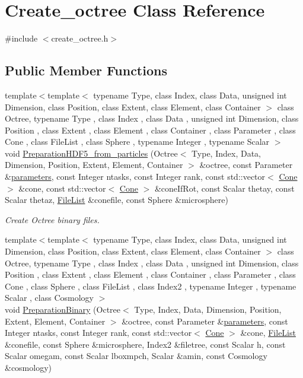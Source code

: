 \hypertarget{classCreate__octree}{\section{Create\-\_\-octree Class Reference}
\label{classCreate__octree}
}


{\ttfamily \#include $<$create\-\_\-octree.\-h$>$}

\subsection*{Public Member Functions}
\begin{DoxyCompactItemize}
\item 
{\footnotesize template$<$template$<$ typename Type, class Index, class Data, unsigned int Dimension, class Position, class Extent, class Element, class Container $>$ class Octree, typename Type , class Index , class Data , unsigned int Dimension, class Position , class Extent , class Element , class Container , class Parameter , class Cone , class File\-List , class Sphere , typename Integer , typename Scalar $>$ }\\void \hyperlink{classCreate__octree_aa5eeca0cadf9d5f3c7e879bff2056db3}{Preparation\-H\-D\-F5\-\_\-from\-\_\-particles} (Octree$<$ Type, Index, Data, Dimension, Position, Extent, Element, Container $>$ \&octree, const Parameter \&\hyperlink{rays_8h_ae1bc8b0b8c8b9f8e4cc61a5cc7c4ce9e}{parameters}, const Integer ntasks, const Integer rank, const std\-::vector$<$ \hyperlink{exceptionCone}{Cone} $>$ \&cone, const std\-::vector$<$ \hyperlink{exceptionCone}{Cone} $>$ \&cone\-If\-Rot, const Scalar thetay, const Scalar thetaz, \hyperlink{exceptionmagrathea_1_1FileList}{File\-List} \&conefile, const Sphere \&microsphere)
\begin{DoxyCompactList}\small\item\em Create Octree binary files. \end{DoxyCompactList}\item 
{\footnotesize template$<$template$<$ typename Type, class Index, class Data, unsigned int Dimension, class Position, class Extent, class Element, class Container $>$ class Octree, typename Type , class Index , class Data , unsigned int Dimension, class Position , class Extent , class Element , class Container , class Parameter , class Cone , class Sphere , class File\-List , class Index2 , typename Integer , typename Scalar , class Cosmology $>$ }\\void \hyperlink{classCreate__octree_a86a2b4ce7276e54d28581e322b50ab70}{Preparation\-Binary} (Octree$<$ Type, Index, Data, Dimension, Position, Extent, Element, Container $>$ \&octree, const Parameter \&\hyperlink{rays_8h_ae1bc8b0b8c8b9f8e4cc61a5cc7c4ce9e}{parameters}, const Integer ntasks, const Integer rank, const std\-::vector$<$ \hyperlink{exceptionCone}{Cone} $>$ \&cone, \hyperlink{exceptionmagrathea_1_1FileList}{File\-List} \&conefile, const Sphere \&microsphere, Index2 \&filetree, const Scalar h, const Scalar omegam, const Scalar lboxmpch, Scalar \&amin, const Cosmology \&cosmology)

\end{DoxyCompactItemize}
